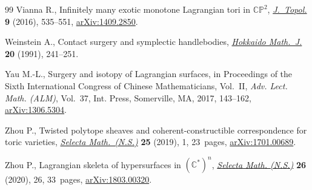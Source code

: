 \begin{thebibliography}{99}
Vianna R., Infinitely many exotic monotone {L}agrangian tori in
 {$\mathbb{CP}^2$}, \href{https://doi.org/10.1112/jtopol/jtw002}{\textit{J.~Topol.}} \textbf{9} (2016), 535--551,
 \href{https://arxiv.org/abs/1409.2850}{arXiv:1409.2850}.

Weinstein A., Contact surgery and symplectic handlebodies, \href{https://doi.org/10.14492/hokmj/1381413841}{\textit{Hokkaido
 Math.~J.}} \textbf{20} (1991), 241--251.

Yau M.-L., Surgery and isotopy of {L}agrangian surfaces, in Proceedings of the
 {S}ixth {I}nternational {C}ongress of {C}hinese {M}athematicians,
 {V}ol.~{II}, \textit{Adv. Lect. Math. (ALM)}, Vol.~37, Int. Press,
 Somerville, MA, 2017, 143--162, \href{https://arxiv.org/abs/1306.5304}{arXiv:1306.5304}.

Zhou P., Twisted polytope sheaves and coherent-constructible correspondence for
 toric varieties, \href{https://doi.org/10.1007/s00029-019-0459-x}{\textit{Selecta Math.~(N.S.)}} \textbf{25} (2019), 1,
 23~pages, \href{https://arxiv.org/abs/1701.00689}{arXiv:1701.00689}.

Zhou P., Lagrangian skeleta of hypersurfaces in {$(\mathbb C^*)^n$},
 \href{https://doi.org/10.1007/s00029-020-00555-9}{\textit{Selecta Math. (N.S.)}} \textbf{26} (2020), 26, 33~pages,
 \href{https://arxiv.org/abs/1803.00320}{arXiv:1803.00320}.

\end{thebibliography}
